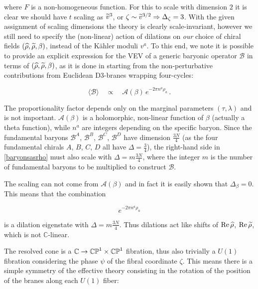 where $F$ is a non-homogeneous function. For this to scale with dimension $2$ it is clear we should have $t$ scaling as $\widetilde{v}^3$, or $\zeta \sim {\ensuremath{\widetilde{v}}}^{3/2} \Rightarrow \Delta_\zeta = 3$. With the given assignment of scaling dimensions the theory is clearly scale-invariant, however we still need to specify the (non-linear) action of dilations on \emph{our} choice of chiral fields $(\widehat{\rho},\widetilde{\rho},\beta)$, instead of the K\"ahler moduli $v^a$. To this end, we note it is possible to provide an explicit expression for the VEV of a generic baryonic operator $\mathcal{B}$ in terms of $(\widehat{\rho}, \widetilde{\rho}, \beta)$, as it is done in \cite{MZ} starting from the non-perturbative contributions from Euclidean D3-branes wrapping four-cycles:

\begin{equation}
	\langle \mathcal{B} \rangle \quad \propto \quad \mathcal{A}(\beta) \, e^{-2\pi n^a \rho_a}\,.
	\label{baryonsasrho}
\end{equation}

The proportionality factor depends only on the marginal parameters $(\tau,\lambda)$ and is not important. $\mathcal{A}(\beta)$ is a holomorphic, non-linear function of $\beta$ (actually a theta function), while $n^a$ are integers depending on the specific baryon. Since the fundamental baryons $\mathcal{B}^A$, $\mathcal{B}^B$, $\mathcal{B}^C$, $\mathcal{B}^D$ have dimension $\frac{3N}{4}$ (as the four fundamental chirals $A$, $B$, $C$, $D$ all have $\Delta = \frac{3}{4}$), the right-hand side in \eqref{baryonsasrho} must also scale with $\Delta = m\frac{3N}{4}$, where the integer $m$ is the number of fundamental baryons to be multiplied to construct $\mathcal{B}$.

The scaling can not come from $\mathcal{A}(\beta)$ and in fact it is easily shown that $\Delta_\beta = 0$. This means that the combination

\begin{equation}
	e^{-2\pi n^a \rho_a}
	\label{}
\end{equation}

is a dilation eigenstate with $\Delta = m\frac{3N}{4}$. Thus dilations act like shifts of $\operatorname{Re} \widehat{\rho}$, $\operatorname{Re} \widetilde{\rho}$, which is not $\mathbb{C}$-linear.

The resolved cone is a $\mathbb{C} \rightarrow \mathbb{CP}^1 \times \mathbb{CP}^1$ fibration, thus also trivially a $U(1)$ fibration considering the phase $\psi$ of the fibral coordinate $\zeta$. This means there is a simple symmetry of the effective theory consisting in the rotation of the position of the branes along each $U(1)$ fiber:

